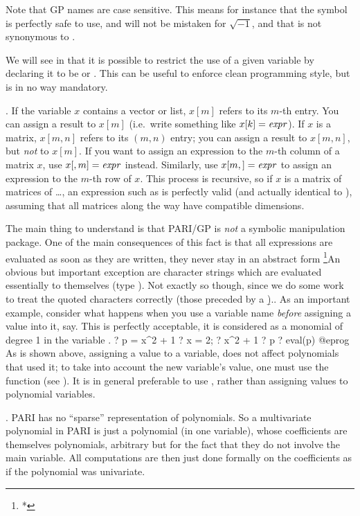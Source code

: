 Note that GP names are case sensitive. This means for instance that the
symbol  is perfectly safe to use, and will not be mistaken for
$\sqrt{-1}$, and that  is not synonymous to .

We will see in  that it is possible to restrict
the use of a given variable by declaring it to be  or
. This can be useful to enforce clean programming style, but
is in no way mandatory.

. If the variable $x$ contains a vector or list,
$x[m]$ refers to its $m$-th entry. You can assign a result to $x[m]$
(i.e.~write something like $x[k]=\hbox{\it expr\/}$). If $x$ is a matrix, $x[m,n]$
refers to its $(m,n)$ entry; you can assign a result to $x[m,n]$, but
\emph{not} to $x[m]$. If you want to assign an expression to the $m$-th
column of a matrix $x$, use $x[,m]=\hbox{\it expr\/}$ instead. Similarly, use
$x[m,]=\hbox{\it expr\/}$ to assign an expression to the $m$-th row of $x$. This
process is recursive, so if $x$ is a matrix of matrices of \dots, an
expression such as  is perfectly valid
(and actually identical to ), assuming
that all matrices along the way have compatible dimensions.

  The main thing to understand is that PARI/GP is \emph{not} a symbolic
manipulation package. One of the main consequences of this fact is that all
expressions are evaluated as soon as they are written, they never stay in an
abstract form%
\footnote{*}{An obvious but important exception are character strings which
are evaluated essentially to themselves (type ). Not exactly
so though, since we do some work to treat the quoted characters correctly
(those preceded by a \b{)}.}.
%
As an important example, consider what happens when you use a variable name
\emph{before} assigning a value into it,  say. This is perfectly
acceptable, it is considered as a monomial of degree 1 in the variable
.
\bprog
  ? p = x^2 + 1
  ? x = 2;
  ? x^2 + 1
  ? p
  ? eval(p)
@eprog\noindent
As is shown above, assigning a value to a variable, does not affect
polynomials that used it; to take into account the new variable's value, one
must use the function  (see ). It is in general
preferable to use , rather than assigning values to polynomial
variables.

.\label{se:priority}
PARI has no ``sparse'' representation of polynomials. So a
multivariate polynomial in PARI is just a polynomial (in one variable), whose
coefficients are themselves polynomials, arbitrary but for the fact that they
do not involve the main variable. All computations are then just done
formally on the coefficients as if the polynomial was univariate.

